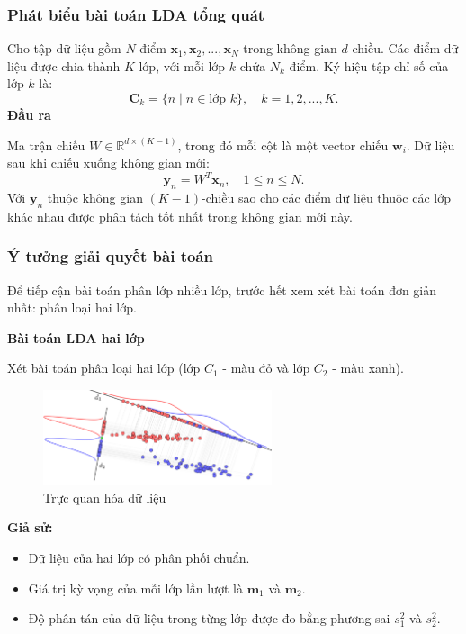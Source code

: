 \subsubsection{Phát biểu bài toán LDA tổng quát}  

Cho tập dữ liệu gồm \( N \) điểm \( \mathbf{x}_1, \mathbf{x}_2, ..., \mathbf{x}_N \) trong không gian \( d \)-chiều.  
Các điểm dữ liệu được chia thành \( K \) lớp, với mỗi lớp \( k \) chứa \( N_k \) điểm.  
Ký hiệu tập chỉ số của lớp \( k \) là:  
\[
\mathbf{C}_k = \{ n \; | \; n \in \text{lớp } k \}, \quad k = 1,2,...,K.
\]  
\textbf{Đầu ra}  

Ma trận chiếu \( W \in \mathbb{R}^{d \times (K-1)} \), trong đó mỗi cột là một vector chiếu \( \mathbf{w}_i \).  
Dữ liệu sau khi chiếu xuống không gian mới:  
\[
\mathbf{y}_n = W^T \mathbf{x}_n, \quad 1 \leq n \leq N.
\]  
Với \( \mathbf{y}_n \) thuộc không gian \( (K-1) \)-chiều  sao cho các điểm dữ liệu thuộc các lớp khác nhau được phân tách tốt nhất trong không gian mới này.

 
\subsubsection{Ý tưởng giải quyết bài toán}  

Để tiếp cận bài toán phân lớp nhiều lớp, trước hết xem xét bài toán đơn giản nhất: phân loại hai lớp.  

\textbf{Bài toán LDA hai lớp}  

Xét bài toán phân loại hai lớp (lớp \( C_1 \) - màu đỏ và lớp \( C_2 \) - màu xanh).  

\begin{figure}[htbp]
    \centering
    \includegraphics[width=0.6\textwidth]{assets/2_1_1.png}
    \caption{Trực quan hóa dữ liệu }
    \label{fig:example}
\end{figure}
  
\textbf{Giả sử:}  
\begin{itemize}
    \item Dữ liệu của hai lớp có phân phối chuẩn.  
    \item Giá trị kỳ vọng của mỗi lớp lần lượt là \( \mathbf{m}_1 \) và \( \mathbf{m}_2 \). 
    \item Độ phân tán của dữ liệu trong từng lớp được đo bằng phương sai \( s_1^2 \) và \( s_2^2 \).
\end{itemize}

